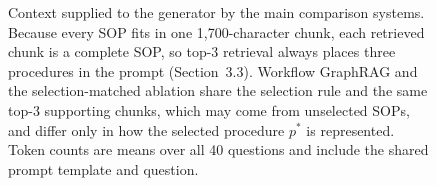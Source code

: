 \begin{figure}[!htbp]
{}
\caption{Context supplied to the generator by the main comparison systems. Because every SOP fits in one 1,700-character chunk, each retrieved chunk is a complete SOP, so top-3 retrieval always places three procedures in the prompt (Section~3.3). Workflow GraphRAG and the selection-matched ablation share the selection rule and the same top-3 supporting chunks, which may come from unselected SOPs, and differ only in how the selected procedure $p^\ast$ is represented. Token counts are means over all 40 questions and include the shared prompt template and question.}
\label{fig:prompt}
\end{figure}

